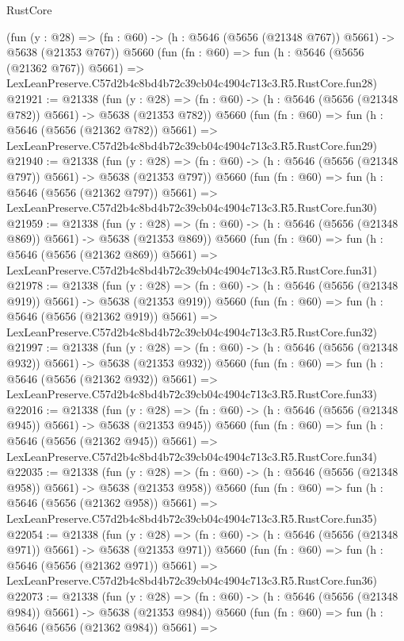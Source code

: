 \begin{lexlean}{RustCore}
\begin{coremodule}
    (fun (y : @28) => (fn : @60) -> (h : @5646 (@5656 (@21348 @767)) @5661) -> @5638 (@21353 @767))
    @5660
    (fun (fn : @60) =>
    fun (h : @5646 (@5656 (@21362 @767)) @5661) =>
    LexLeanPreserve.C57d2b4c8bd4b72c39cb04c4904c713c3.R5.RustCore.fun28)
@21921 := @21338
    (fun (y : @28) => (fn : @60) -> (h : @5646 (@5656 (@21348 @782)) @5661) -> @5638 (@21353 @782))
    @5660
    (fun (fn : @60) =>
    fun (h : @5646 (@5656 (@21362 @782)) @5661) =>
    LexLeanPreserve.C57d2b4c8bd4b72c39cb04c4904c713c3.R5.RustCore.fun29)
@21940 := @21338
    (fun (y : @28) => (fn : @60) -> (h : @5646 (@5656 (@21348 @797)) @5661) -> @5638 (@21353 @797))
    @5660
    (fun (fn : @60) =>
    fun (h : @5646 (@5656 (@21362 @797)) @5661) =>
    LexLeanPreserve.C57d2b4c8bd4b72c39cb04c4904c713c3.R5.RustCore.fun30)
@21959 := @21338
    (fun (y : @28) => (fn : @60) -> (h : @5646 (@5656 (@21348 @869)) @5661) -> @5638 (@21353 @869))
    @5660
    (fun (fn : @60) =>
    fun (h : @5646 (@5656 (@21362 @869)) @5661) =>
    LexLeanPreserve.C57d2b4c8bd4b72c39cb04c4904c713c3.R5.RustCore.fun31)
@21978 := @21338
    (fun (y : @28) => (fn : @60) -> (h : @5646 (@5656 (@21348 @919)) @5661) -> @5638 (@21353 @919))
    @5660
    (fun (fn : @60) =>
    fun (h : @5646 (@5656 (@21362 @919)) @5661) =>
    LexLeanPreserve.C57d2b4c8bd4b72c39cb04c4904c713c3.R5.RustCore.fun32)
@21997 := @21338
    (fun (y : @28) => (fn : @60) -> (h : @5646 (@5656 (@21348 @932)) @5661) -> @5638 (@21353 @932))
    @5660
    (fun (fn : @60) =>
    fun (h : @5646 (@5656 (@21362 @932)) @5661) =>
    LexLeanPreserve.C57d2b4c8bd4b72c39cb04c4904c713c3.R5.RustCore.fun33)
@22016 := @21338
    (fun (y : @28) => (fn : @60) -> (h : @5646 (@5656 (@21348 @945)) @5661) -> @5638 (@21353 @945))
    @5660
    (fun (fn : @60) =>
    fun (h : @5646 (@5656 (@21362 @945)) @5661) =>
    LexLeanPreserve.C57d2b4c8bd4b72c39cb04c4904c713c3.R5.RustCore.fun34)
@22035 := @21338
    (fun (y : @28) => (fn : @60) -> (h : @5646 (@5656 (@21348 @958)) @5661) -> @5638 (@21353 @958))
    @5660
    (fun (fn : @60) =>
    fun (h : @5646 (@5656 (@21362 @958)) @5661) =>
    LexLeanPreserve.C57d2b4c8bd4b72c39cb04c4904c713c3.R5.RustCore.fun35)
@22054 := @21338
    (fun (y : @28) => (fn : @60) -> (h : @5646 (@5656 (@21348 @971)) @5661) -> @5638 (@21353 @971))
    @5660
    (fun (fn : @60) =>
    fun (h : @5646 (@5656 (@21362 @971)) @5661) =>
    LexLeanPreserve.C57d2b4c8bd4b72c39cb04c4904c713c3.R5.RustCore.fun36)
@22073 := @21338
    (fun (y : @28) => (fn : @60) -> (h : @5646 (@5656 (@21348 @984)) @5661) -> @5638 (@21353 @984))
    @5660
    (fun (fn : @60) =>
    fun (h : @5646 (@5656 (@21362 @984)) @5661) =>

\end{coremodule}
\end{lexlean}
